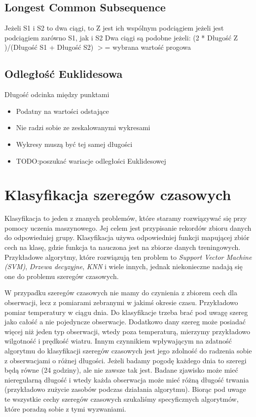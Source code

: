         \subsection{Longest Common Subsequence}
            Jeżeli S1 i S2 to dwa ciągi, to Z jest ich wspólnym podciągiem jeżeli jest podciągiem zarówno S1, jak i S2
            Dwa ciągi są podobne jeżeli:
            (2 * Długość Z )/(Długość S1 + Długość S2) $>$= wybrana wartość progowa 
    
        \subsection{Odległość Euklidesowa}
        \label{theory:Euklides}
             Długość odcinka między punktami
            \begin{itemize}
                \item Podatny na wartości odstające
                \item Nie radzi sobie ze zeskalowanymi wykresami
                \item Wykresy muszą być tej samej długości
                \item TODO:poszukać wariacje odległości Euklidesowej
            \end{itemize}
    \section{Klasyfikacja szeregów czasowych}
        Klasyfikacja to jeden z znanych problemów, które staramy rozwiązywać się przy pomocy uczenia maszynowego. Jej celem jest przypisanie rekordów zbioru danych do odpowiedniej grupy. Klasyfikacja używa odpowiedniej funkcji mapującej zbiór cech na klasę, gdzie funkcja ta nauczona jest na zbiorze danych treningowych\cite{Classification_theory}. Przykładowe algorytmy, które rozwiązują ten problem to \textit{Support Vector Machine (SVM)}, \textit{Drzewa decyzyjne}, \textit{KNN} i wiele innych, jednak niekonieczne nadają się one do problemu szeregów czasowych.
        
        W przypadku szeregów czasowych nie mamy do czynienia z zbiorem cech dla obserwacji, lecz z pomiarami zebranymi w jakimś okresie czasu. Przykładowo pomiar temperatury w ciągu dnia. Do klasyfikacje trzeba brać pod uwagę szereg jako całość a nie pojedyncze obserwacje. Dodatkowo dany szereg może posiadać więcej niż jeden typ obserwacji, wtedy poza temperaturą, mierzymy przykładowo wilgotność i prędkość wiatru. Innym czynnikiem wpływającym na zdatność algorytmu do klasyfikacji szeregów czasowych jest jego zdolność do radzenia sobie z obserwacjami o różnej długości. Jeżeli badamy pogodę każdego dnia to szeregi będą równe (24 godziny), ale nie zawsze tak jest. Badane zjawisko może mieć nieregularną długość i wtedy każda obserwacja może mieć różną długość trwania (przykładowo zużycie zasobów podczas działania algorytmu). Biorąc pod uwage te wszystkie cechy szeregów czasowych szukaliśmy specyficznych algorytmów, które poradzą sobie z tymi wyzwaniami.
        
